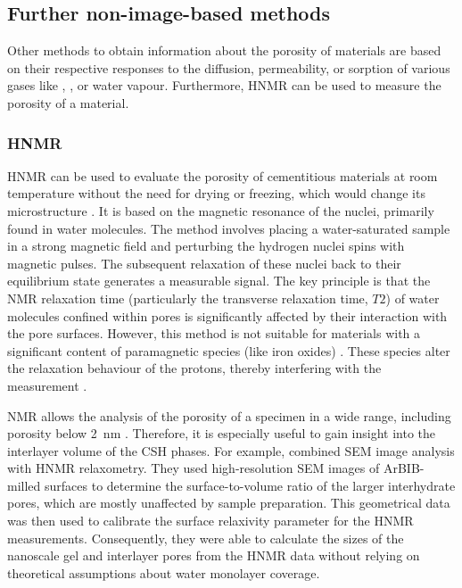 \subsection{Further non-image-based methods}
\label{subsec:other_porosity}

Other methods to obtain information about the porosity of materials are based on their respective responses to the diffusion, permeability, or sorption of various gases like , , or water vapour.
Furthermore, \ac{HNMR} can be used to measure the porosity of a material.

\subsubsection[Proton nuclear magnetic resonance spectroscopy]{\Acl*{HNMR}}

\ac{HNMR} can be used to evaluate the porosity of cementitious materials at room temperature without the need for drying or freezing, which would change its microstructure \cite{gran.1997,muller.2014,naber.2020}.
It is based on the magnetic resonance of the  nuclei, primarily found in water molecules.
The method involves placing a water-saturated sample in a strong magnetic field and perturbing the hydrogen nuclei spins with magnetic pulses.
The subsequent relaxation of these nuclei back to their equilibrium state generates a measurable signal.
The key principle is that the \ac{NMR} relaxation time (particularly the transverse relaxation time, $T2$) of water molecules confined within pores is significantly affected by their interaction with the pore surfaces. %
However, this method is not suitable for materials with a significant content of paramagnetic species (like iron oxides) \cite{barrie.2000}. 
These species alter the relaxation behaviour of the protons, thereby interfering with the measurement \cite{muller.2014}.

\ac{NMR} allows the analysis of the porosity of a specimen in a wide range, including porosity below \qty{2}{\nano\meter} \cite{barrie.2000}. 
Therefore, it is especially useful to gain insight into the interlayer volume of the \ac{CSH} phases.
For example, \textcite{naber.2020} combined \ac{SEM} image analysis with \ac{HNMR} relaxometry.
They used high-resolution \ac{SEM} images of \ac{ArBIB}-milled surfaces to determine the surface-to-volume ratio of the larger interhydrate pores, which are mostly unaffected by sample preparation.
This geometrical data was then used to calibrate the surface relaxivity parameter for the \ac{HNMR} measurements.
Consequently, they were able to calculate the sizes of the nanoscale gel and interlayer pores from the \ac{HNMR} data without relying on theoretical assumptions about water monolayer coverage.

